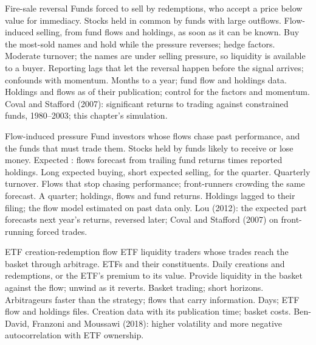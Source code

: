 \begin{strategyfile}{Fire-sale reversal}\label{strat:s1:flows:firesale}
 Funds forced to sell by redemptions, who accept a price below value for immediacy.
 Stocks held in common by funds with large outflows.
 Flow-induced selling, from fund flows and holdings, as soon as it can be known.
 Buy the most-sold names and hold while the pressure reverses; hedge factors.
 Moderate turnover; the names are under selling pressure, so liquidity is available to a buyer.
 Reporting lags that let the reversal happen before the signal arrives; confounds with momentum.
 Months to a year; fund flow and holdings data.
 Holdings and flows as of their publication; control for the factors and momentum.
 Coval and Stafford (2007): significant returns to trading against constrained funds, 1980--2003; this chapter's simulation.
\end{strategyfile}

\begin{strategyfile}{Flow-induced pressure}\label{strat:s1:flows:pressure}
 Fund investors whose flows chase past performance, and the funds that must trade them.
 Stocks held by funds likely to receive or lose money.
 Expected : flows forecast from trailing fund returns times reported holdings.
 Long expected buying, short expected selling, for the quarter.
 Quarterly turnover.
 Flows that stop chasing performance; front-runners crowding the same forecast.
 A quarter; holdings, flows and fund returns.
 Holdings lagged to their filing; the flow model estimated on past data only.
 Lou (2012): the expected part forecasts next year's returns, reversed later; Coval and Stafford (2007) on front-running forced trades.
\end{strategyfile}

\begin{strategyfile}{ETF creation-redemption flow}\label{strat:s1:flows:etf}
 ETF liquidity traders whose trades reach the basket through arbitrage.
 ETFs and their constituents.
 Daily creations and redemptions, or the ETF's premium to its value.
 Provide liquidity in the basket against the flow; unwind as it reverts.
 Basket trading; short horizons.
 Arbitrageurs faster than the strategy; flows that carry information.
 Days; ETF flow and holdings files.
 Creation data with its publication time; basket costs.
 Ben-David, Franzoni and Moussawi (2018): higher volatility and more negative autocorrelation with ETF ownership.
\end{strategyfile}

